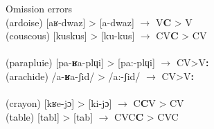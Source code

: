 \documentclass[output=paper,newtxmath,modfonts,nonflat,draftmode]{langsci/langscibook}
\begin{document}

\ea Omission errors \label{ex:takam:omission_errors}
\ea{}\\
(ardoise) [aʁ-dwaz] > [a-dwaz] $\rightarrow$ V\textbf{C} > V\\
(couscous) [kuskus] > [ku-kus] $\rightarrow$ CV\textbf{C} > CV\\

\ex{}\\
(parapluie) [pa-\textbf{ʁ}a-plɥi] > [pa:-plɥi] $\rightarrow$ CV>V\textbf{:}\\
(arachide) /a-\textbf{ʁ}a-ʃid/ >  /a:-ʃid/ $\rightarrow$ CV>V\textbf{:}\\

\ex{}\\
(crayon) [kʁe-jɔ] > [ki-jɔ] $\rightarrow$ C\textbf{C}V > CV\\
(table)  [tabl] > [tab] $\rightarrow$ CVC\textbf{C} > CVC\\
\end{document}
